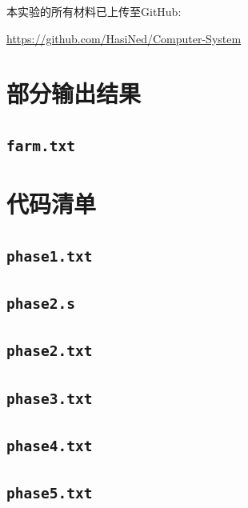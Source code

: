 本实验的所有材料已上传至GitHub:

\url{https://github.com/HasiNed/Computer-System}

\setupappendix

\clearpage
\section{部分输出结果}

\subsection{\texttt{farm.txt}}\label{farm}

\clearpage
\section{代码清单}\label{codelist}

\subsection{\texttt{phase1.txt}}\label{phase1ans}

\subsection{\texttt{phase2.s}}\label{phase2asm}

\subsection{\texttt{phase2.txt}}\label{phase2ans}

\subsection{\texttt{phase3.txt}}\label{phase3ans}

\clearpage
\subsection{\texttt{phase4.txt}}\label{phase4ans}

\subsection{\texttt{phase5.txt}}\label{phase5ans}
